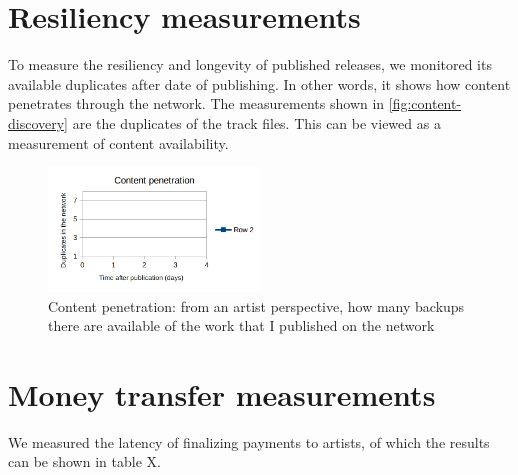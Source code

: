\section{Resiliency measurements}
To measure the resiliency and longevity of published releases, we monitored its available duplicates after date of publishing. In other words, it shows how content penetrates through the network. The measurements shown in \ref{fig:content-discovery} are the duplicates of the track files. This can be viewed as a measurement of content availability.

\begin{figure}
    \centering
    \includegraphics[width=0.5\textwidth]{experiments/content-penetration.png}
    \caption{Content penetration: from an artist perspective, how many backups there are available of the work that I published on the network}
    \label{fig:content-penetration}
\end{figure}

\section{Money transfer measurements}
We measured the latency of finalizing payments to artists, of which the results can be shown in table X.